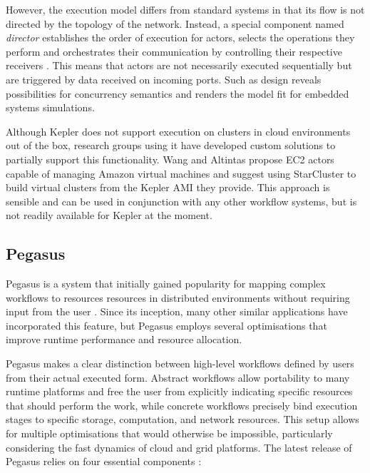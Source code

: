 However, the execution model differs from standard systems in that its flow is not directed by the topology of the network. Instead, a special component named \textit{director} establishes the order of execution for actors, selects the operations they perform and orchestrates their communication by controlling their respective receivers \cite{Curcin2008}. This means that actors are not necessarily executed sequentially but are triggered by data received on incoming ports. Such as design reveals possibilities for concurrency semantics and renders the model fit for embedded systems simulations.

Although Kepler does not support execution on clusters in cloud environments out of the box, research groups using it have developed custom solutions to partially support this functionality. Wang and Altintas \cite{Wang2012} propose EC2 actors capable of managing Amazon virtual machines and suggest using StarCluster \cite{StarCluster} to build virtual clusters from the Kepler AMI they provide. This approach is sensible and can be used in conjunction with any other workflow systems, but is not readily available for Kepler at the moment.

\subsection{Pegasus}

Pegasus \cite{Pegasus} is a system that initially gained popularity for mapping complex workflows to resources resources in distributed environments without requiring input from the user \cite{Deelman2004}. Since its inception, many other similar applications have incorporated this feature, but Pegasus employs several optimisations that improve runtime performance and resource allocation.

Pegasus makes a clear distinction between high-level workflows defined by users from their actual executed form. Abstract workflows allow portability to many runtime platforms and free the user from explicitly indicating specific resources that should perform the work, while concrete workflows precisely bind execution stages to specific storage, computation, and network resources. This setup allows for multiple optimisations that would otherwise be impossible, particularly considering the fast dynamics of cloud and grid platforms. The latest release of Pegasus relies on four essential components \cite{Deelman2013, Deelman2016}:

